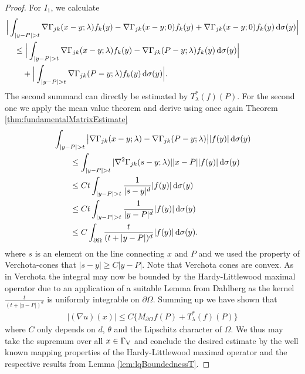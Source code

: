 \begin{proof}
   For $I_1$, we calculate
   \begin{align*}
     &\Big| \int_{| y - P | > t} \nabla \Gamma_{j k} (x - y; \lambda) f_k(y) - \nabla \Gamma_{jk}(x - y; 0) f_k(y) + \nabla \Gamma_{jk}(x - y; 0) f_k(y) \, {\operatorname{d}\!{\sigma}}(y) \Big| \\
     &\quad\leq \Big| \int_{|y - P| > t} \nabla\Gamma_{jk}(x - y; \lambda) f_k(y) - \nabla\Gamma_{jk}(P - y; \lambda) f_k(y) \, {\operatorname{d}\!{\sigma}}(y) \Big| \\
     &\qquad+ \Big| \int_{|y - P| > t} \nabla\Gamma_{jk}(P - y; \lambda) f_k(y) \, {\operatorname{d}\!{\sigma}}(y) \Big|.
   \end{align*}
  The second summand can directly be estimated by $T_\lambda^*(f)(P)$.
  For the second one we apply the mean value theorem and derive using once again Theorem \ref{thm:fundamentalMatrixEstimate}
  \begin{align*}
    &\int_{|y - P| > t} \big| \nabla\Gamma_{jk}(x - y; \lambda) - \nabla\Gamma_{jk}(P - y; \lambda) \big| |f(y)| \, {\operatorname{d}\!{\sigma}}(y) \\ 
    &\qquad\leq \int_{|y - P| > t} |\nabla^2 \Gamma_{jk}(s - y; \lambda)| |x - P| |f(y) | \, {\operatorname{d}\!{\sigma}}(y) \\
    &\qquad\leq C t \int_{|y - P| > t} \frac{1}{|s - y|^{d}} |f(y)| \, {\operatorname{d}\!{\sigma}}(y) \\
    &\qquad\leq C t \int_{|y - P| > t} \frac{1}{|y - P|^{d}} |f(y)| \, {\operatorname{d}\!{\sigma}}(y) \\
    &\qquad\leq C \int_{\partial\Omega} \frac{t}{(t + |y - P|)^d} |f(y)| \, {\operatorname{d}\!{\sigma}}(y).
  \end{align*}
  where $s$ is an element on the line connecting $x$ and $P$ and we used the property of Verchota-cones that $|s - y| \geq C |y - P|$.
  Note that Verchota cones are convex.
  As in Verchota \cite{verchotaDiss} the integral may now be bounded by the Hardy-Littlewood maximal operator due to an application of a suitable Lemma from Dahlberg \cite{dahlberg} as the kernel $\frac{t}{(t + |y - P|)^d}$ is uniformly integrable on $\partial\Omega$.
  Summing up we have shown that
  \begin{align*}
    |(\nabla u)(x)| \leq C \big\{ M_{\partial\Omega} f(P) + T_\lambda^*(f)(P) \}
  \end{align*}
  where $C$ only depends on $d$, $\theta$ and the Lipschitz character of $\Omega$.
  We thus may take the supremum over all $x \in \Gamma_\mathrm{V}$ and conclude the desired estimate by the well known mapping properties of the Hardy-Littlewood maximal operator and the respective results from Lemma \ref{lem:lqBoundednessT}.

\end{proof}
